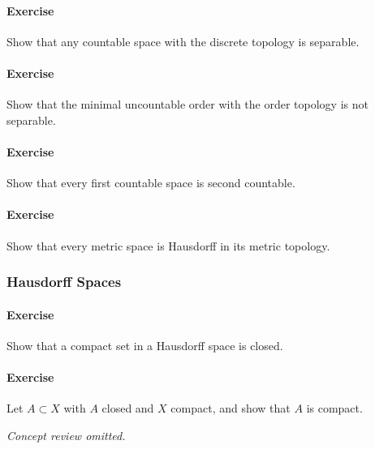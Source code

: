 \hypertarget{exercise-37}{%
\paragraph{Exercise}\label{exercise-37}}

Show that any countable space with the discrete topology is separable.

\hypertarget{exercise-38}{%
\paragraph{Exercise}\label{exercise-38}}

Show that the minimal uncountable order with the order topology is not
separable.

\hypertarget{exercise-39}{%
\paragraph{Exercise}\label{exercise-39}}

Show that every first countable space is second countable.

\hypertarget{exercise-40}{%
\paragraph{Exercise}\label{exercise-40}}

Show that every metric space is Hausdorff in its metric topology.

\hypertarget{hausdorff-spaces}{%
\subsubsection{Hausdorff Spaces}\label{hausdorff-spaces}}

\hypertarget{exercise-41}{%
\paragraph{Exercise}\label{exercise-41}}

Show that a compact set in a Hausdorff space is closed.

\hypertarget{exercise-42}{%
\paragraph{Exercise}\label{exercise-42}}

Let \(A\subset X\) with \(A\) closed and \(X\) compact, and show that
\(A\) is compact.

\emph{Concept review omitted.}


